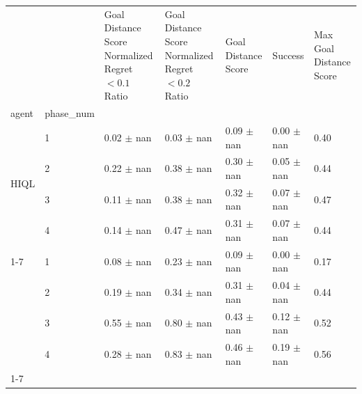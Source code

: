 \begin{tabular}{lllllll}
\toprule
 &  & Goal Distance Score Normalized Regret $< 0.1$ Ratio & Goal Distance Score Normalized Regret $< 0.2$ Ratio & Goal Distance Score & Success & Max Goal Distance Score \\
agent & phase_num &  &  &  &  &  \\
\midrule
\multirow[t]{4}{*}{HIQL} & 1 & 0.02 $\pm$ nan & 0.03 $\pm$ nan & 0.09 $\pm$ nan & 0.00 $\pm$ nan & 0.40 \\
 & 2 & 0.22 $\pm$ nan & 0.38 $\pm$ nan & 0.30 $\pm$ nan & 0.05 $\pm$ nan & 0.44 \\
 & 3 & 0.11 $\pm$ nan & 0.38 $\pm$ nan & 0.32 $\pm$ nan & 0.07 $\pm$ nan & 0.47 \\
 & 4 & 0.14 $\pm$ nan & 0.47 $\pm$ nan & 0.31 $\pm$ nan & 0.07 $\pm$ nan & 0.44 \\
\cline{1-7}
\multirow[t]{4}{*}{QRL} & 1 & 0.08 $\pm$ nan & 0.23 $\pm$ nan & 0.09 $\pm$ nan & 0.00 $\pm$ nan & 0.17 \\
 & 2 & 0.19 $\pm$ nan & 0.34 $\pm$ nan & 0.31 $\pm$ nan & 0.04 $\pm$ nan & 0.44 \\
 & 3 & 0.55 $\pm$ nan & 0.80 $\pm$ nan & 0.43 $\pm$ nan & 0.12 $\pm$ nan & 0.52 \\
 & 4 & 0.28 $\pm$ nan & 0.83 $\pm$ nan & 0.46 $\pm$ nan & 0.19 $\pm$ nan & 0.56 \\
\cline{1-7}
\bottomrule
\end{tabular}
